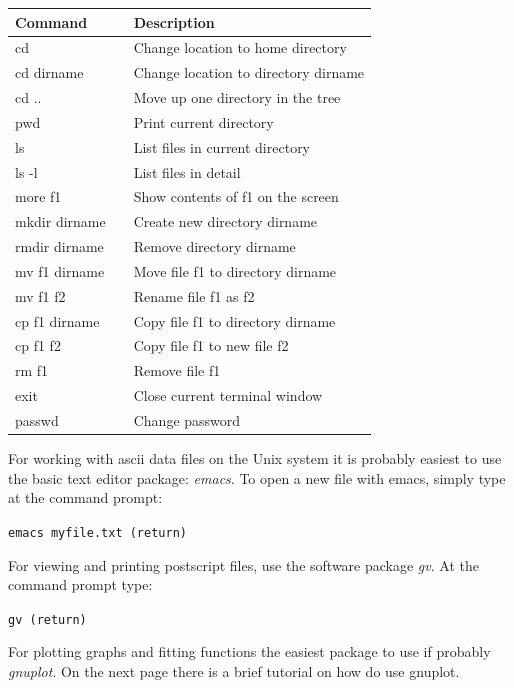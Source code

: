 \documentclass[12pt]{article}
\begin{document}
\begin{table}[h]
\begin{tabular}{lll}
\hline
Command&&Description\\
\hline
cd                &&  Change location to home directory\\
cd dirname        &&  Change location to directory dirname\\
cd ..             &&  Move up one directory in the tree\\
pwd               && Print current directory\\
ls                && List files in current directory\\
ls -l             && List files in detail\\
more f1           && Show contents of f1 on the screen\\
mkdir dirname     &&  Create new directory dirname\\
rmdir dirname     &&  Remove directory dirname\\
mv f1 dirname     && Move file f1 to directory dirname\\
mv f1 f2          && Rename file f1 as f2\\
cp f1 dirname     && Copy file f1 to directory dirname\\
cp f1 f2          && Copy file f1 to new file f2\\
rm f1             && Remove file f1\\
exit              && Close current terminal window\\
passwd            && Change password\\
\hline
\end{tabular}
\end{table}

\medskip 


For working with ascii data files on the Unix system it is probably
easiest to use the basic text editor package: {\it emacs}. To open a new
file with emacs, simply type at the command prompt:

{\tt emacs myfile.txt (return)}

For viewing and printing postscript files, use the software package
{\it gv}. At the command prompt type:

{\tt gv (return)}

For plotting graphs and fitting functions the easiest package to use
if probably {\it gnuplot}. On the next page there is a brief tutorial
on how do use gnuplot.
\end{document}
